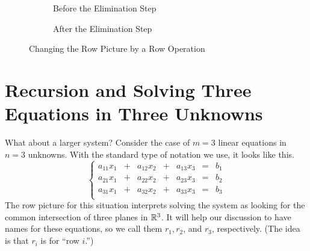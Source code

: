 \documentclass[00-livre-main.tex]{subfiles}
\begin{document}
\begin{figure}[h]
\centering
\begin{subfigure}[b]{0.45\textwidth}
\caption{Before the Elimination Step}
\end{subfigure}
\qquad
\begin{subfigure}[b]{0.45\textwidth}
\caption{After the Elimination Step}
\end{subfigure}
\caption{Changing the Row Picture by a Row Operation}
\label{fig:row-change}
\end{figure}

\section*{Recursion and Solving Three Equations in Three Unknowns}

What about a larger system? Consider the case of $m=3$ linear equations in $n=3$ unknowns. With the standard type of notation we use, it looks like this.
\[
\left\{\begin{array}{rrrrrrr}
a_{11}x_1 & + & a_{12} x_2 & + & a_{13}x_3 & = & b_1 \\
a_{21}x_1 & + & a_{22} x_2 & + & a_{23}x_3 & = & b_2 \\
a_{31}x_1 & + & a_{32} x_2 & + & a_{33}x_3 & = & b_3 \\
\end{array}\right.
\]
The row picture for this situation interprets solving the system as looking for 
the common intersection of three planes in $\mathbb{R}^3$. It will help our discussion to have names for these equations, so we call them $r_1, r_2$, and $r_3$, respectively. (The idea is that $r_i$ is for ``row $i$.'')
\end{document}
